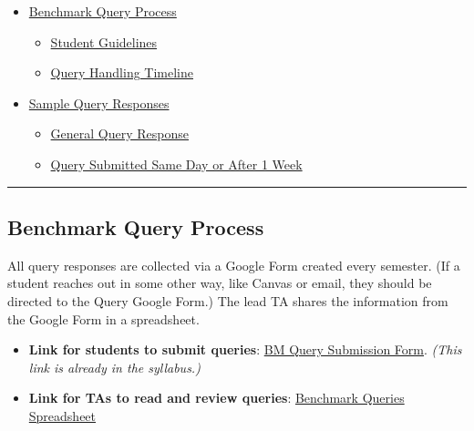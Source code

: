\documentclass[
]{article}
\providecommand{\tightlist}{%
  \setlength{\itemsep}{0pt}\setlength{\parskip}{0pt}}
\begin{document}
\begin{itemize}
\tightlist
\item
  \protect\hyperlink{benchmark-query-process}{Benchmark Query Process}

  \begin{itemize}
  \tightlist
  \item
    \protect\hyperlink{student-guidelines}{Student Guidelines}\\
  \item
    \protect\hyperlink{query-handling-timeline}{Query Handling Timeline}\\
  \end{itemize}
\item
  \protect\hyperlink{sample-query-responses}{Sample Query Responses}

  \begin{itemize}
  \tightlist
  \item
    \protect\hyperlink{general-query-response}{General Query Response}\\
  \item
    \protect\hyperlink{query-submitted-same-day-or-after-1-week}{Query Submitted Same Day or After 1 Week}
  \end{itemize}
\end{itemize}

\begin{center}\rule{0.5\linewidth}{0.5pt}\end{center}

\hypertarget{benchmark-query-process}{%
\subsection{Benchmark Query Process}\label{benchmark-query-process}}

All query responses are collected via a Google Form created every semester. (If a student reaches out in some other way, like Canvas or email, they should be directed to the Query Google Form.) The lead TA shares the information from the Google Form in a spreadsheet.

\begin{itemize}
\tightlist
\item
  \textbf{Link for students to submit queries}: \href{https://docs.google.com/forms/d/e/1FAIpQLScYNAgevXAAGxNpb4ZcvrgqLZcxAFTuuJVh2lnxgro9giPDhA/viewform?usp=header}{BM Query Submission Form}. \emph{(This link is already in the syllabus.)}\\
\item
  \textbf{Link for TAs to read and review queries}: \href{https://docs.google.com/spreadsheets/d/157q5gae1Fw06ENQTDr1A2MhT3Q_qqqx4PAqaWady7K8/edit?gid=1566396974\#gid=1566396974}{Benchmark Queries Spreadsheet}
\end{itemize}
\end{document}
